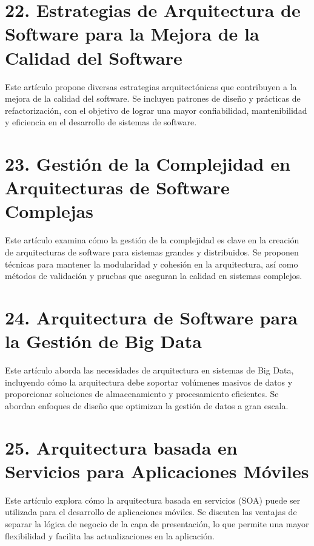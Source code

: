 \documentclass[twocolumn]{article}
\begin{document}
\printbibliography[heading=subbibliography]

\section*{22. Estrategias de Arquitectura de Software para la Mejora de la Calidad del Software}
Este artículo propone diversas estrategias arquitectónicas que contribuyen a la mejora de la calidad del software. Se incluyen patrones de diseño y prácticas de refactorización, con el objetivo de lograr una mayor confiabilidad, mantenibilidad y eficiencia en el desarrollo de sistemas de software.



\printbibliography[heading=subbibliography]

\section*{23. Gestión de la Complejidad en Arquitecturas de Software Complejas}
Este artículo examina cómo la gestión de la complejidad es clave en la creación de arquitecturas de software para sistemas grandes y distribuidos. Se proponen técnicas para mantener la modularidad y cohesión en la arquitectura, así como métodos de validación y pruebas que aseguran la calidad en sistemas complejos.



\printbibliography[heading=subbibliography]

\section*{24. Arquitectura de Software para la Gestión de Big Data}
Este artículo aborda las necesidades de arquitectura en sistemas de Big Data, incluyendo cómo la arquitectura debe soportar volúmenes masivos de datos y proporcionar soluciones de almacenamiento y procesamiento eficientes. Se abordan enfoques de diseño que optimizan la gestión de datos a gran escala.



\printbibliography[heading=subbibliography]

\section*{25. Arquitectura basada en Servicios para Aplicaciones Móviles}
Este artículo explora cómo la arquitectura basada en servicios (SOA) puede ser utilizada para el desarrollo de aplicaciones móviles. Se discuten las ventajas de separar la lógica de negocio de la capa de presentación, lo que permite una mayor flexibilidad y facilita las actualizaciones en la aplicación.
\end{document}
